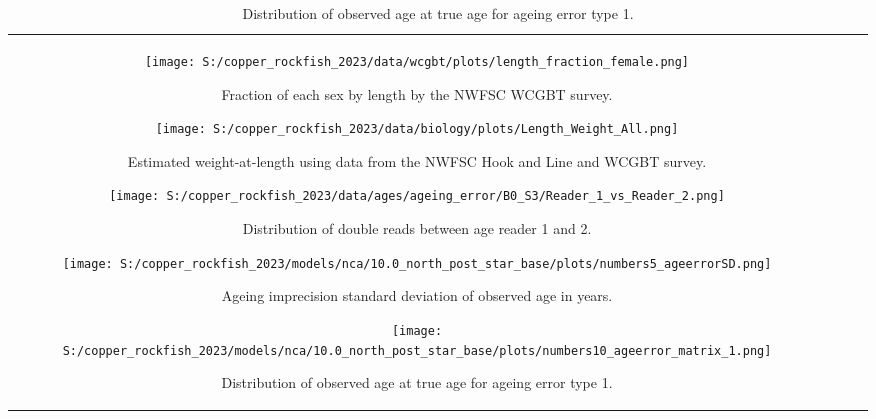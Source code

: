 \documentclass[11pt,
  letterpaper,
]{article}
\begin{document}
\begin{longtable}[t]{c>{\centering\arraybackslash}p{2cm}>{\centering\arraybackslash}p{2cm}>{\centering\arraybackslash}p{2cm}}
\pagebreak

\begin{figure}
{\centering
\texttt{[image: S:/copper\_rockfish\_2023/data/wcgbt/plots/length\_fraction\_female.png]}
}
\caption{Fraction of each sex by length by the NWFSC WCGBT survey.\label{fig:frac-sex-len}}
\end{figure}

\pagebreak

\begin{figure}
{\centering
\texttt{[image: S:/copper\_rockfish\_2023/data/biology/plots/Length\_Weight\_All.png]}
}
\caption{Estimated weight-at-length using data from the NWFSC Hook and Line and WCGBT survey.\label{fig:weight-length}}
\end{figure}

\pagebreak

\begin{figure}
{\centering
\texttt{[image: S:/copper\_rockfish\_2023/data/ages/ageing\_error/B0\_S3/Reader\_1\_vs\_Reader\_2.png]}
}
\caption{Distribution of double reads between age reader 1 and 2.\label{fig:age-error-dist}}
\end{figure}

\pagebreak

\begin{figure}
{\centering
\texttt{[image: S:/copper\_rockfish\_2023/models/nca/10.0\_north\_post\_star\_base/plots/numbers5\_ageerrorSD.png]}
}
\caption{Ageing imprecision standard deviation of observed age in years.\label{fig:age-error}}
\end{figure}

\pagebreak

\begin{figure}
{\centering
\texttt{[image: S:/copper\_rockfish\_2023/models/nca/10.0\_north\_post\_star\_base/plots/numbers10\_ageerror\_matrix\_1.png]}
}
\caption{Distribution of observed age at true age for ageing error type 1.\label{fig:age-error-matrix}}
\end{figure}


\end{longtable}
\end{document}
